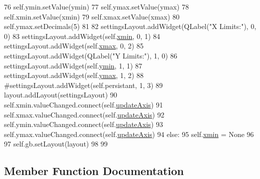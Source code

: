 \begin{DoxyCode}
76             self.ymin.setValue(ymin)
77             self.ymax.setValue(ymax)
78             self.xmin.setValue(xmin)
79             self.xmax.setValue(xmax)
80             self.ymax.setDecimals(5)
81 
82             settingsLayout.addWidget(QLabel(\textcolor{stringliteral}{"X Limits:"}), 0, 0)
83             settingsLayout.addWidget(self.\hyperlink{classsoftware_1_1chipwhisperer_1_1common_1_1ui_1_1pysidegraph_1_1pysideGraph_affbe2e3bea77d4b0cd32f2d9be71bbd1}{xmin}, 0, 1)
84             settingsLayout.addWidget(self.\hyperlink{classsoftware_1_1chipwhisperer_1_1common_1_1ui_1_1pysidegraph_1_1pysideGraph_ac3a7736676c107cf00d620ea1a81501c}{xmax}, 0, 2)
85             settingsLayout.addWidget(QLabel(\textcolor{stringliteral}{"Y Limits:"}), 1, 0)
86             settingsLayout.addWidget(self.\hyperlink{classsoftware_1_1chipwhisperer_1_1common_1_1ui_1_1pysidegraph_1_1pysideGraph_aa375bd6e4a50393a64c9f1a6e9938cbb}{ymin}, 1, 1)
87             settingsLayout.addWidget(self.\hyperlink{classsoftware_1_1chipwhisperer_1_1common_1_1ui_1_1pysidegraph_1_1pysideGraph_a00fdd1c1b1bc39b2aa614a75d0179f13}{ymax}, 1, 2)
88             \textcolor{comment}{#settingsLayout.addWidget(self.persistant, 1, 3)}
89             layout.addLayout(settingsLayout)
90             self.xmin.valueChanged.connect(self.\hyperlink{classsoftware_1_1chipwhisperer_1_1common_1_1ui_1_1pysidegraph_1_1pysideGraph_a426a8dae477fe542788a9d3e97008e8f}{updateAxis})
91             self.xmax.valueChanged.connect(self.\hyperlink{classsoftware_1_1chipwhisperer_1_1common_1_1ui_1_1pysidegraph_1_1pysideGraph_a426a8dae477fe542788a9d3e97008e8f}{updateAxis})
92             self.ymin.valueChanged.connect(self.\hyperlink{classsoftware_1_1chipwhisperer_1_1common_1_1ui_1_1pysidegraph_1_1pysideGraph_a426a8dae477fe542788a9d3e97008e8f}{updateAxis})
93             self.ymax.valueChanged.connect(self.\hyperlink{classsoftware_1_1chipwhisperer_1_1common_1_1ui_1_1pysidegraph_1_1pysideGraph_a426a8dae477fe542788a9d3e97008e8f}{updateAxis})
94         \textcolor{keywordflow}{else}:
95             self.\hyperlink{classsoftware_1_1chipwhisperer_1_1common_1_1ui_1_1pysidegraph_1_1pysideGraph_affbe2e3bea77d4b0cd32f2d9be71bbd1}{xmin} = \textcolor{keywordtype}{None}
96             
97         self.gb.setLayout(layout)
98 
99 
\end{DoxyCode}


\subsection{Member Function Documentation}
\hypertarget{classsoftware_1_1chipwhisperer_1_1common_1_1ui_1_1pysidegraph_1_1pysideGraph_a8f77708511153cf3cc66ba6b2de930b9}{}
